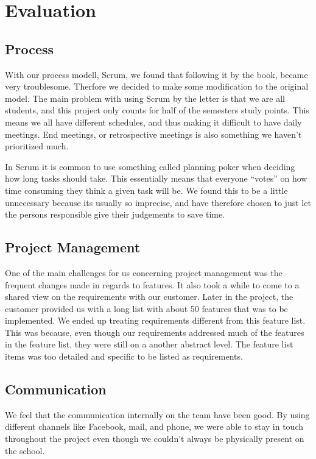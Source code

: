 \section{Evaluation}
\thispagestyle{plain}
	\subsection{Process}

With our process modell, Scrum, we found that following it by the book, became very troublesome. Therfore we decided to make some modification to the original model. The main problem with using Scrum by the letter is that we are all students, and this project only counts for half of the semesters study points. This means we all have different schedules, and thus making it difficult to have daily meetings. End meetings, or retrospective meetings is also something we haven’t prioritized much.

In Scrum it is common to use something called planning poker when deciding how long tasks should take. This essentially means that everyone “votes” on how time consuming they think a given task will be. We found this to be a little unnecessary because its usually so imprecise, and have therefore chosen to just let the persons responsible give their judgements to save time. 

	\subsection{Project Management}

One of the main challenges for us concerning project management was the frequent changes made in regards to features. It also took a while to come to a shared view on the requirements with our customer. Later in the project, the customer provided us with a long list with about 50 features that was to be implemented. We ended up treating requirements different from this feature list. This was because, even though our requirements addressed much of the features in the feature list, they were still on a another abstract level. The feature list items was too detailed and specific to be listed as requirements.

	\subsection{Communication}

We feel that the communication internally on the team have been good. By using different channels like Facebook, mail, and phone, we were able to stay in touch throughout the project even though we couldn't always be physically present on the school.

